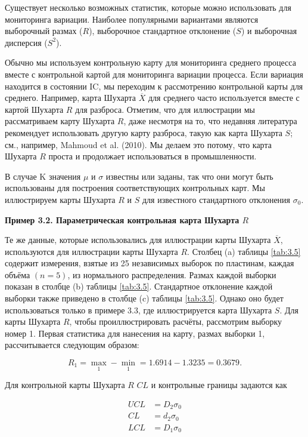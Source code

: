 Существует несколько возможных статистик, которые можно использовать для мониторинга вариации. Наиболее популярными вариантами являются выборочный размах (\(R\)), выборочное стандартное отклонение (\(S\)) и выборочная дисперсия (\(S^2\)).

Обычно мы используем контрольную карту для мониторинга среднего процесса вместе с контрольной картой для мониторинга вариации процесса. Если вариация находится в состоянии IC, мы переходим к рассмотрению контрольной карты для среднего. Например, карта Шухарта \(\overline{X}\) для среднего часто используется вместе с картой Шухарта \(R\) для разброса. Отметим, что для иллюстрации мы рассматриваем карту Шухарта \(R\), даже несмотря на то, что недавняя литература рекомендует использовать другую карту разброса, такую как карта Шухарта \(S\); см., например, Mahmoud et al. (2010). Мы делаем это потому, что карта Шухарта \(R\) проста и продолжает использоваться в промышленности.

В случае K значения \(\mu\) и \(\sigma\) известны или заданы, так что они могут быть использованы для построения соответствующих контрольных карт. Мы иллюстрируем карты Шухарта \(R\) и \(S\) для известного стандартного отклонения \(\sigma_0\).

\noindent\textbf{Пример 3.2. Параметрическая контрольная карта Шухарта \(R\)}

Те же данные, которые использовались для иллюстрации карты Шухарта \(\overline{X}\), используются для иллюстрации карты Шухарта \(R\). Столбец (a) таблицы \ref{tab:3.5} содержит измерения, взятые из 25 независимых выборок по пластинам, каждая объёма \((n = 5)\), из нормального распределения. Размах каждой выборки показан в столбце (b) таблицы \ref{tab:3.5}. Стандартное отклонение каждой выборки также приведено в столбце (c) таблицы \ref{tab:3.5}. Однако оно будет использоваться только в примере 3.3, где иллюстрируется карта Шухарта \(S\). Для карты Шухарта \(R\), чтобы проиллюстрировать расчёты, рассмотрим выборку номер 1. Первая статистика для нанесения на карту, размах выборки 1, рассчитывается следующим образом:

\[
R_1 = \max_1 - \min_1 = 1.6914 - 1.3235 = 0.3679.
\]

Для контрольной карты Шухарта \(R\) \(CL\) и контрольные границы задаются как

\begin{equation}
	\begin{aligned}
		UCL &= D_2\sigma_0 \\
		CL &= d_2\sigma_0 \\
		LCL &= D_1\sigma_0
	\end{aligned}
	\label{eq:3.14}
\end{equation}


